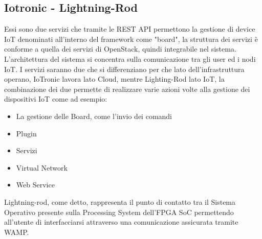 \subsection{Iotronic - Lightning-Rod}
Essi sono due servizi che tramite le REST API permettono la gestione di device IoT denominati all'interno del framework come "board", la struttura dei servizi è conforme a quella dei servizi di OpenStack, quindi integrabile nel sistema.\\
L'architettura del sistema si concentra sulla comunicazione tra gli user ed i nodi IoT. I servizi saranno due che si differenziano per che lato dell'infrastruttura operano, IoTronic lavora lato Cloud, mentre Lighting-Rod lato IoT, la combinazione dei due permette di realizzare varie azioni volte alla gestione dei dispositivi IoT come ad esempio:
\begin{itemize}
    \item La gestione delle Board, come l'invio dei comandi
    \item Plugin
    \item Servizi
    \item Virtual Network
    \item Web Service
\end{itemize}
Lightning-rod, come detto, rappresenta il punto di contatto tra il Sistema Operativo presente sulla Processing System dell'FPGA SoC permettendo all'utente di interfacciarsi attraverso una comunicazione assicurata tramite WAMP.
